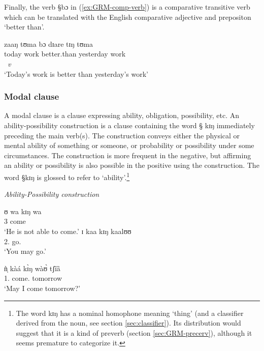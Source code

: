 Finally,  the verb {\S bɔ} in (\ref{ex:GRM-comp-verb}) is a comparative
transitive verb which can be translated with the English comparative adjective
and prepositon `better than'.


\begin{exe}
\ex\label{ex:GRM-comp-verb}
\glll zaaŋ tʊma bɔ dɪare tɪŋ tʊma \\
today work better.than yesterday {\art} work\\
{}  {}  {\it v} {} {}   {}\\
\glt `Today's work is better than yesterday's work'
\end{exe}


\subsubsection{Modal clause}
\label{sec:GRM-compar-ct}

A modal clause is a clause expressing  ability, obligation, possibility, etc. An
ability-possibility construction is a clause containing the word {\S
kɪŋ} immediately preceding the main verb(s).  The construction conveys either
the
physical or mental
ability of something or someone, or    probability or possibility under some
circumstances. The construction is more frequent in the negative, but affirming
an ability or possibility is also possible in the positive using the
construction. The word {\S kɪŋ} is glossed  {\abl} to refer to
`ability'.\footnote{The word {\F kɪŋ} has a  nominal homophone meaning 
`thing' (and a classifier derived from the noun, see section
\ref{sec:classifier}).  Its distribution would suggest that it is a kind of 
preverb (section \ref{sec:GRM-precerv}), although it seems premature to
categorize it.}


\begin{exe}
\ex\label{ex:GRM-modal}{\it Ability-Possibility construction}
\begin{xlist}
\ex\label{ex:GRM-modal-12.2}
\gll ʊ wa kɪŋ wa\\
{3\sg} {\neg} {\abl} come\\
`He is not able to come.'
\ex  
\gll ɪ kaa kɪŋ kaalʊʊ\\
 {2.\sg} {\fut} {\abl} go.{\foc} \\
`You may go.'

\ex\label{ex:GRM-modal-13.1}
\gll ǹ̩ kàá kɪ̀ŋ wàʊ̀ tʃȉȁ\\
 {1.\sg}  {\fut} {\abl} come.{\foc} tomorrow\\
\glt `May I come tomorrow?'
\end{xlist}
\end{exe}

